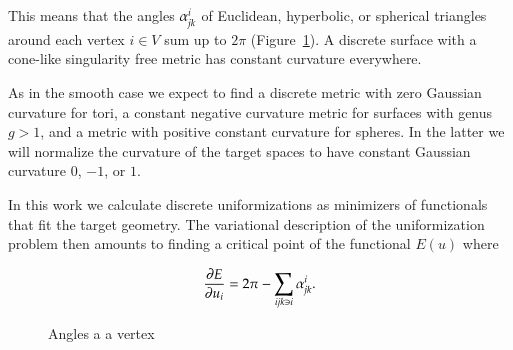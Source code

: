 \documentclass[Thesis.tex]{subfiles}
\begin{document}
This means that the angles $\alpha_{\it{jk}}^i$ of Euclidean, hyperbolic, or spherical triangles around each vertex  $i\in V$ sum up to $2\pi$ (Figure~\ref{fig:angles_at_vertex}). A discrete surface with a cone-like singularity free metric has constant curvature everywhere. 

As in the smooth case we expect to find a discrete metric with zero Gaussian curvature for tori, a constant negative curvature metric for surfaces with genus $g>1$, and a metric with positive constant curvature for spheres. In the latter we will normalize the curvature of the target spaces to have constant Gaussian curvature $0$, $-1$, or $1$. 

In this work we calculate discrete uniformizations as minimizers of functionals that fit the target geometry. The variational description of the uniformization problem then amounts to finding a critical point of the functional $E(u)$ where

\begin{equation}
\label{eq:gradient_variational}
\frac{\partial E}{\partial u_i} = 2\pi - \sum_{\it{ijk}\ni i} \alpha^i_{\it{jk}}.
\end{equation}  

\begin{figure}
\centering
\scalebox{0.4}{}
\caption[Angles at a vertex]{Angles a a vertex}
\label{fig:angles_at_vertex}
\end{figure}

\subfilebibliography
\end{document}
